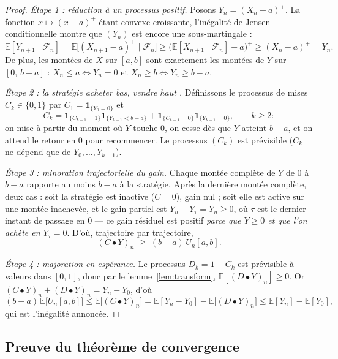 \documentclass[11pt,a4paper]{article}
\theoremstyle{plain}
\theoremstyle{definition}
\theoremstyle{remark}
\newcommand{\E}{\mathbb{E}}
\newcommand{\F}{\mathcal{F}}
\newcommand{\ind}{\mathbf{1}}
\begin{document}
\begin{proof}
\emph{Étape 1 : réduction à un processus positif.} Posons
$Y_n = (X_n - a)^+$. La fonction $x \mapsto (x-a)^+$ étant convexe croissante,
l'inégalité de Jensen conditionnelle montre que $(Y_n)$ est encore une
sous-martingale :
\[
\E[Y_{n+1} \mid \F_n] = \E\bigl[(X_{n+1}-a)^+ \mid \F_n\bigr]
\ge \bigl(\E[X_{n+1} \mid \F_n] - a\bigr)^+ \ge (X_n - a)^+ = Y_n.
\]
De plus, les montées de $X$ sur $[a,b]$ sont exactement les montées de $Y$ sur
$[0,\, b-a]$ : $X_n \le a \iff Y_n = 0$ et $X_n \ge b \iff Y_n \ge b-a$.

\emph{Étape 2 : la stratégie \og acheter bas, vendre haut \fg.} Définissons le
processus de mises $C_k \in \{0,1\}$ par $C_1 = \ind_{\{Y_0 = 0\}}$ et
\[
C_k = \ind_{\{C_{k-1} = 1\}} \ind_{\{Y_{k-1} < b-a\}}
    + \ind_{\{C_{k-1} = 0\}} \ind_{\{Y_{k-1} = 0\}},
\qquad k \ge 2 :
\]
on mise à partir du moment où $Y$ touche $0$, on cesse dès que $Y$ atteint
$b-a$, et on attend le retour en $0$ pour recommencer. Le processus $(C_k)$ est
prévisible ($C_k$ ne dépend que de $Y_0, \dots, Y_{k-1}$).

\emph{Étape 3 : minoration trajectorielle du gain.} Chaque montée complète de
$Y$ de $0$ à $b-a$ rapporte au moins $b-a$ à la stratégie. Après la dernière
montée complète, deux cas : soit la stratégie est inactive ($C = 0$), gain nul ;
soit elle est active sur une montée inachevée, et le gain partiel est
$Y_n - Y_{\tau} = Y_n \ge 0$, où $\tau$ est le dernier instant de passage en $0$
--- ce gain résiduel est positif \emph{parce que $Y \ge 0$ et que l'on achète en
$Y_\tau = 0$}. D'où, trajectoire par trajectoire,
\[
(C \bullet Y)_n \;\ge\; (b-a)\, U_n[a,b].
\]

\emph{Étape 4 : majoration en espérance.} Le processus $D_k = 1 - C_k$ est
prévisible à valeurs dans $[0,1]$, donc par le lemme~\ref{lem:transform},
$\E[(D \bullet Y)_n] \ge 0$. Or $(C\bullet Y)_n + (D \bullet Y)_n = Y_n - Y_0$,
d'où
\[
(b-a)\,\E\bigl[U_n[a,b]\bigr] \le \E\bigl[(C\bullet Y)_n\bigr]
= \E[Y_n - Y_0] - \E\bigl[(D\bullet Y)_n\bigr]
\le \E[Y_n] - \E[Y_0],
\]
qui est l'inégalité annoncée.
\end{proof}

\subsection{Preuve du théorème de convergence}
\end{document}
